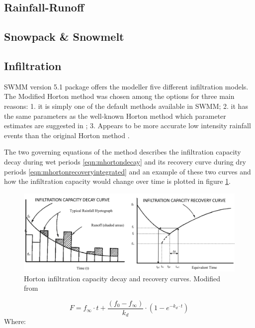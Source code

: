 \subsection{Rainfall-Runoff} 

\subsection{Snowpack \& Snowmelt} 

\subsection{Infiltration}

SWMM version 5.1 package offers the modeller five different infiltration models. The Modified Horton method \cite{akan1992,akan2003} was chosen among the options for three main reasons: 1. it is simply one of the default methods available in SWMM;  2. it has the same parameters as the well-known Horton method which parameter estimates are suggested in \citet{Rossman2016}; 3. Appears to be more accurate low intensity rainfall events than the original Horton method \cite{Rossman2016}. 

The two governing equations of the method describes the infiltration capacity decay during wet periods \ref{eqn:mhortondecay} and its recovery curve during dry periods \ref{eqn:mhortonrecoveryintegrated} and an example of these two curves and how the infiltration capacity would change over time is plotted in figure \ref{fig:horton}. 

\begin{figure}[h]
    \centering
	\includegraphics[scale=0.45]{figures/hortoncurves.png}
	\caption{Horton infiltration capacity decay and recovery curves. Modified from \cite{Rossman2016}}
	\label{fig:horton}
\end{figure}

\begin{equation}
\label{eqn:mhortondecay}
F = f_\infty \cdot t + \frac{(f_0 - f_\infty)}{k_d} \cdot (1 - e^{-k_d\cdot t})
\end{equation}
Where: \\

